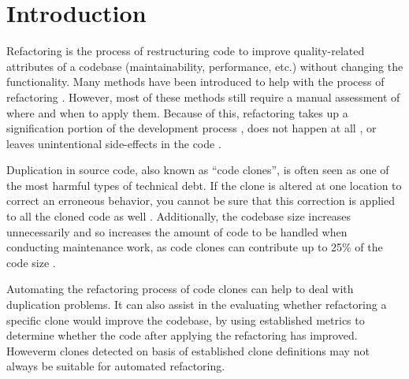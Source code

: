 \chapter{Introduction}
\label{ch:introduction}
Refactoring is the process of restructuring code to improve quality-related attributes of a codebase (maintainability, performance, etc.) without changing the functionality. Many methods have been introduced to help with the process of refactoring \cite{fowler2018refactoring, wake2004refactoring}. However, most of these methods still require a manual assessment of where and when to apply them. Because of this, refactoring takes up a signification portion of the development process \cite{lientz1978characteristics, mens2004survey}, does not happen at all \cite{mens2003refactoring}, or leaves unintentional side-effects in the code \cite{bavota2012does}. %

Duplication in source code, also known as ``code clones'', is often seen as one of the most harmful types of technical debt. If the clone is altered at one location to correct an erroneous behavior, you cannot be sure that this correction is applied to all the cloned code as well \cite{ostberg2014automatically}. Additionally, the codebase size increases unnecessarily and so increases the amount of code to be handled when conducting maintenance work, as code clones can contribute up to 25\% of the code size \cite{bruntink2005use}.

Automating the refactoring process of code clones can help to deal with duplication problems. It can also assist in the evaluating whether refactoring a specific clone would improve the codebase, by using established metrics \cite{heitlager2007practical} to determine whether the code after applying the refactoring has improved. Howeverm clones detected on basis of established clone definitions \cite{roy2007survey} may not always be suitable for automated refactoring.

